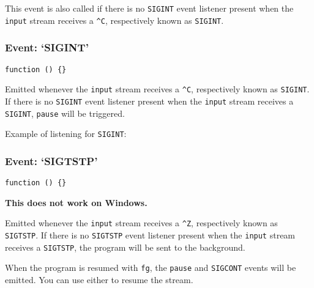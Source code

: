 This event is also called if there is no \texttt{SIGINT} event listener
present when the \texttt{input} stream receives a \texttt{\^{}C},
respectively known as \texttt{SIGINT}.

\subsubsection{Event: `SIGINT'}

\texttt{function () \{\}}

Emitted whenever the \texttt{input} stream receives a \texttt{\^{}C},
respectively known as \texttt{SIGINT}. If there is no \texttt{SIGINT}
event listener present when the \texttt{input} stream receives a
\texttt{SIGINT}, \texttt{pause} will be triggered.

Example of listening for \texttt{SIGINT}:

\begin{Shaded}
\begin{Highlighting}[]
\NormalTok{(}\NormalTok{, }\NormalTok{() \{}
  \NormalTok{(}\NormalTok{, }
     \NormalTok{(}\NormalTok{(}\OtherTok{/}\FloatTok{^}\FloatTok{(}\NormalTok{)) }\NormalTok{();}
  \NormalTok{\});}
\NormalTok{\});}
\end{Highlighting}
\end{Shaded}

\subsubsection{Event: `SIGTSTP'}

\texttt{function () \{\}}

\textbf{This does not work on Windows.}

Emitted whenever the \texttt{input} stream receives a \texttt{\^{}Z},
respectively known as \texttt{SIGTSTP}. If there is no \texttt{SIGTSTP}
event listener present when the \texttt{input} stream receives a
\texttt{SIGTSTP}, the program will be sent to the background.

When the program is resumed with \texttt{fg}, the \texttt{pause} and
\texttt{SIGCONT} events will be emitted. You can use either to resume
the stream.


